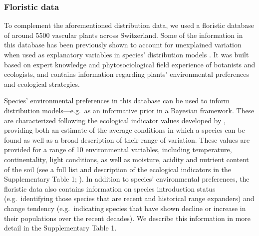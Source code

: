 \documentclass[11pt, a4paper]{article}
\begin{document}
\subsubsection*{Floristic data}
To complement the aforementioned distribution data, we used a floristic database of around 5500 vascular plants across Switzerland. Some of the information in this database has been previously shown to account for unexplained variation when used as explanatory variables in species' distribution models \citep{scherrerEcologicalIndicatorValues2019}.  It was built based on expert knowledge and phytosociological field experience of botanists and ecologists, and contains information regarding plants' environmental preferences and ecological strategies. 

Species' environmental preferences in this database can be used to inform distribution models---e.g.~as an informative prior in a Bayesian framework. These are characterized following the ecological indicator values developed by \citet{landoltFloraIndicativaOkologische2010}, providing both an estimate of the average conditions in which a species can be found as well as a broad description of their range of variation. These values are provided for a range of 10 environmental variables, including temperature, continentality, light conditions, as well as moisture, acidity and nutrient content of the soil (see a full list and description of the ecological indicators in the Supplementary Table 1; \citealt{landoltFloraIndicativaOkologische2010}). In addition to species' environmental preferences, the floristic data also contains information on species introduction status (e.g.~identifying those species that are recent and historical range expanders) and change tendency (e.g.~indicating species that have shown decline or increase in their populations over the recent decades). We describe this information in more detail in the Supplementary Table 1.

\end{document}
